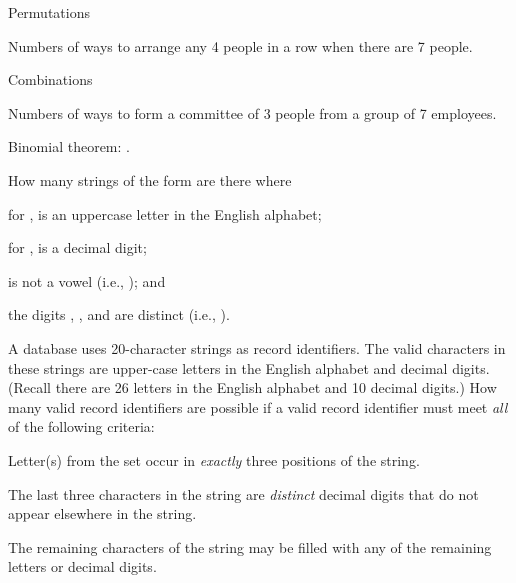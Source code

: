 			\item  Permutations

				Numbers of ways to arrange any 4 people in a row when there are 7 people.

			\item  Combinations

				Numbers of ways to form a committee of 3 people from a group of 7 employees.

			\item  Binomial theorem: .

		\stopitemize

		\page

		\startexercise [title={AC Ex 2.7}]
			How many strings of the form  are there where
			\startitemize [m, joinedup]
				\item  for ,  is an uppercase letter in the English alphabet;
				\item  for ,  is a decimal digit;
				\item  {} is not a vowel (i.e., ); and
				\item  the digits , , and  are distinct (i.e., ).
			\stopitemize
		\stopexercise

		\startsolution
		\stopsolution


		\startexercise [title={AC Ex 2.9}]
			A database uses 20-character strings as record identifiers. The valid characters in these strings are upper-case letters in the English alphabet and decimal digits. (Recall there are 26 letters in the English alphabet and 10 decimal digits.) How many valid record identifiers are possible if a valid record identifier must meet \emph{all} of the following criteria:
			\startitemize [m, joinedup]
				\item  Letter(s) from the set \m{\bcrl[A, E, I, O, U]} occur in \emph{exactly} three positions of the string.
				\item  The last three characters in the string are \emph{distinct} decimal digits that do not appear elsewhere in the string.
				\item  The remaining characters of the string may be filled with any of the remaining letters or decimal digits.
			\stopitemize
		\stopexercise

		\startsolution
		\stopsolution
	
